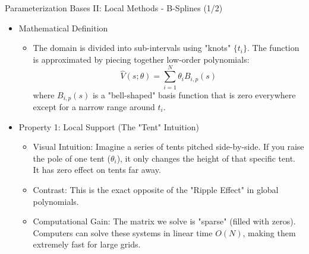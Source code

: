 \documentclass[aspectratio=169]{beamer}
\newcommand{\1}{\mathbf{1}}
\begin{document}
\begin{frame}{Parameterization Bases II: Local Methods - B-Splines (1/2)}
\small
    \begin{itemize}
        \item Mathematical Definition
        \begin{itemize}
            \item The domain is divided into sub-intervals using "knots" $\{t_i\}$. The function is approximated by piecing together low-order polynomials:
            $$ \hat{V}(s; \theta) = \sum_{i=1}^{N} \theta_i B_{i,p}(s) $$
            where $B_{i,p}(s)$ is a "bell-shaped" basis function that is zero everywhere except for a narrow range around $t_i$.
        \end{itemize}
    
        \item Property 1: Local Support (The "Tent" Intuition)
        \begin{itemize}
            \item Visual Intuition: Imagine a series of tents pitched side-by-side. If you raise the pole of one tent ($\theta_i$), it only changes the height of that specific tent. It has zero effect on tents far away.
            \item Contrast: This is the exact opposite of the "Ripple Effect" in global polynomials.
            \item Computational Gain: The matrix we solve is "sparse" (filled with zeros). Computers can solve these systems in linear time $O(N)$, making them extremely fast for large grids.
        \end{itemize}
    \end{itemize}
    \end{frame}
    
\end{document}
